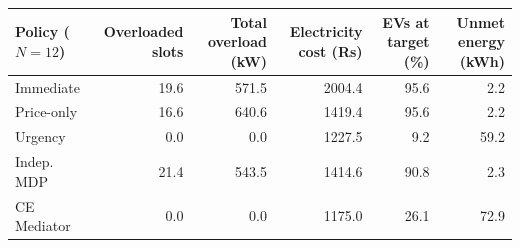 \begin{tabular}{lrrrrr}
\toprule
Policy ($N=12$) & Overloaded slots & Total overload (kW) & Electricity cost (Rs) & EVs at target (\%) & Unmet energy (kWh) \\
\midrule
        Immediate & 19.6 & 571.5 & 2004.4 & 95.6 & 2.2 \\
        Price-only & 16.6 & 640.6 & 1419.4 & 95.6 & 2.2 \\
        Urgency & 0.0 & 0.0 & 1227.5 & 9.2 & 59.2 \\
        Indep. MDP & 21.4 & 543.5 & 1414.6 & 90.8 & 2.3 \\
        CE Mediator & 0.0 & 0.0 & 1175.0 & 26.1 & 72.9 \\
\bottomrule
\end{tabular}
